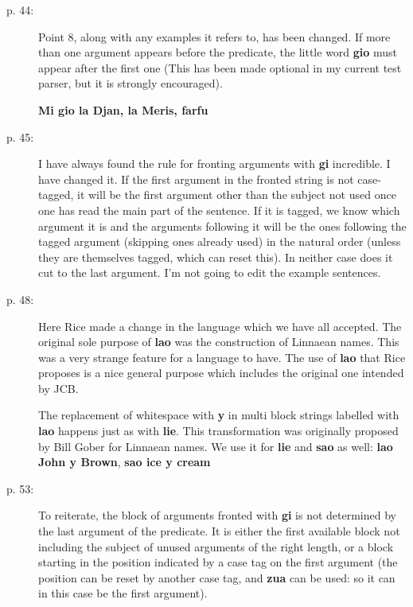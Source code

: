 \documentclass[12pt]{article}
\begin{document}
\begin{description}

\item[p. 44:]  Point 8, along with any examples it refers to, has been changed.  If more than one argument appears before the predicate, the little word {\bf gio} must appear after the first one (This has been made optional in my current test parser, but it is strongly encouraged).

{\bf Mi gio la Djan, la Meris, farfu}

\item[p. 45:]  I have always found the rule for fronting arguments with {\bf gi} incredible.  I have changed it.
If the first argument in the fronted string is not case-tagged, it will be the first argument other than the subject not used once one has read the main part of the sentence.  If it is tagged, we know which argument it is and the arguments following it will be the ones following the tagged argument (skipping ones already used) in the natural order (unless they are themselves tagged, which can reset this).  In neither case does it cut to the last argument.  I'm not going to edit the example sentences.

\item[p. 48:]  Here Rice made a change in the language which we have all accepted.  The original sole purpose of
{\bf lao} was the construction of Linnaean names.  This was a very strange feature for a language to have.  The use of {\bf lao} that Rice proposes is a nice general purpose which includes the original one intended by JCB.

The replacement of whitespace with {\bf y} in multi block strings labelled with {\bf lao} happens just as with {\bf lie}.
This transformation was originally proposed by Bill Gober for Linnaean names.  We use it for {\bf lie} and {\bf sao} as well:  {\bf lao John y Brown}, {\bf sao ice y cream}

\item[p. 53:]  To reiterate, the block of arguments fronted with {\bf gi} is not determined by the last argument of the predicate.  It is either the first available block not including the subject of unused arguments of the right length, or a block starting in the position indicated by a case tag on the first argument (the position can be reset by another case tag, and {\bf zua} can be used:  so it can in this case be the first argument).

\end{description}
\end{document}
